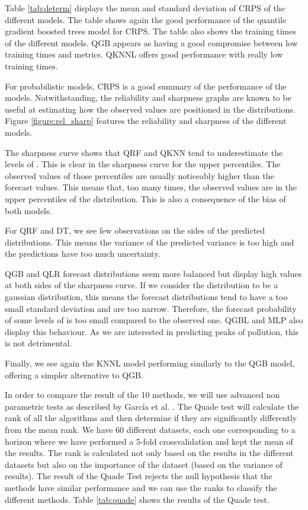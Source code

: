 \documentclass[a4paper,3p,sort&compress]{elsarticle}
\begin{document}
Table \ref{tab:determ} displays the mean and standard deviation of CRPS 
of the different models. The table shows again the good
performance of the quantile 
gradient boosted trees model for CRPS. The table also shows the training times 
of the different models. QGB appears as having a good compromise 
between low training times and metrics. QKNNL offers good performance with really low 
training times.

For probabilistic models, CRPS is a good summary of the performance of
the models. Notwithstanding, the reliability and sharpness graphs are
known to be useful at estimating how the observed values are
positioned in the distributions.  Figure \ref{figure:rel_sharp}
features the reliability and sharpness of the different models.

The sharpness curve shows that 
QRF
and QKNN tend to underestimate the levels of
\no. This is clear in the sharpness curve for the
upper percentiles. The observed values of those percentiles are
usually noticeably higher than the forecast values. This means that,
too many times, the observed values are in the upper percentiles of
the distribution. This is also a consequence of the bias of both
models.

For QRF and DT, we see few 
observations on the sides of the predicted distributions. This means 
the variance of the predicted variance is too high and the predictions 
have too much uncertainty.

QGB and QLR forecast
distributions seem more balanced but display high values at both sides
of the sharpness curve.  If we consider the distribution to be a
gaussian distribution, this means the forecast distributions tend to
have a too small standard deviation and are too narrow. Therefore, the
forecast probability of some levels of \no is too
small compared to the observed one. QGBL and MLP also display this behaviour.
As we are interested in predicting peaks of pollution, 
this is not detrimental.

Finally, we see again the KNNL model performing similarly to the QGB model, offering 
a simpler alternative to QGB.


In order to compare the result of the 10 methods, we will use advanced 
non parametric tests as described by García et al. \cite{garcia_advanced_2010} . 
The Quade test will calculate the rank of all the algorithms and 
then determine if they are significantly differently from the mean rank. 
We have 60 different datasets, each one corresponding to a horizon 
where we have performed 
a 5-fold crossvalidation and kept the mean of the results.
The rank is calculated not only based on the results in the different 
datasets but also on the importance of the dataset 
(based on the variance of results). 
The result of the Quade Test rejects the null hypothesis that the methods have 
similar performance and we can use the ranks to classify the different methods. 
Table \ref{tab:quade} shows the results of the Quade test.
\end{document}
